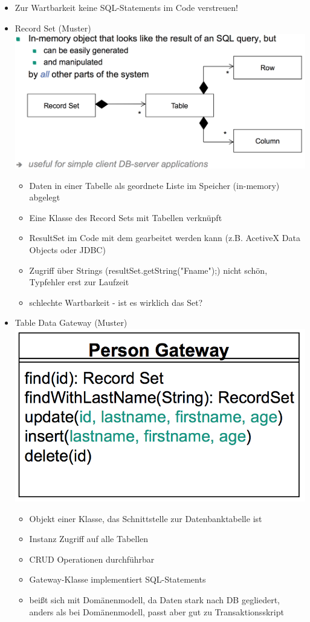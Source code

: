 \documentclass[paper=a4, fontsize=11pt]{scrartcl} %
\numberwithin{equation}{section} %
\numberwithin{figure}{section} %
\numberwithin{table}{section} %
\begin{document}
\begin{itemize}
\begin{itemize}
\begin{itemize}
      \item Zur Wartbarkeit keine SQL-Statements im Code verstreuen!
      \item Record Set (Muster)\\
      \includegraphics[width=.7\textwidth]{imgs/recordset}
      \begin{itemize}
        \item Daten in einer Tabelle als geordnete Liste im Speicher (in-memory) abgelegt
        \item Eine Klasse des Record Sets mit Tabellen verknüpft
        \item ResultSet im Code mit dem gearbeitet werden kann (z.B. AcetiveX Data Objects oder JDBC)
        \item Zugriff über Strings (resultSet.getString("Fname");) nicht schön, Typfehler erst zur Laufzeit
        \item schlechte Wartbarkeit - ist es wirklich das Set?
      \end{itemize}
      \item Table Data Gateway (Muster)\\
      \includegraphics[width=.4\textwidth]{imgs/tdgateway}
      \begin{itemize}
        \item Objekt einer Klasse, das Schnittstelle zur Datenbanktabelle ist
        \item Instanz Zugriff auf alle Tabellen
        \item CRUD Operationen durchführbar
        \item Gateway-Klasse implementiert SQL-Statements
        \item beißt sich mit Domänenmodell, da Daten stark nach DB gegliedert, anders als bei Domänenmodell, passt aber gut zu Transaktionsskript

\end{itemize}
\end{itemize}
\end{itemize}
\end{itemize}
\end{document}
